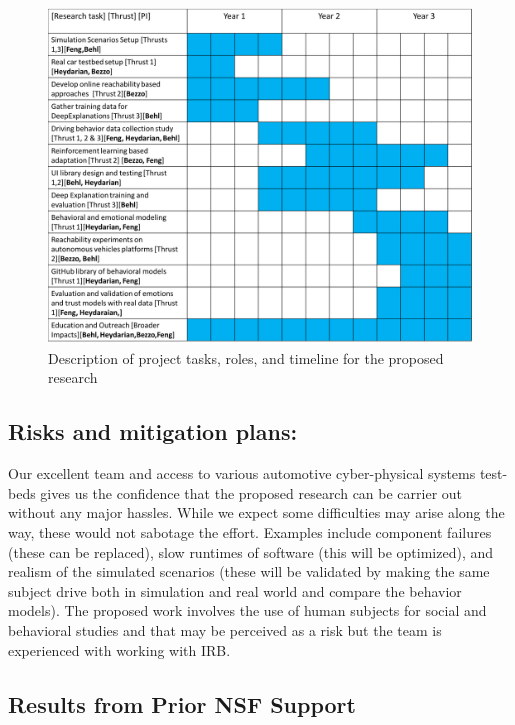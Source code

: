 \begin{figure}
    \centering
    \includegraphics[width=0.8\columnwidth]{figures/gantt_plan.png}
    \caption{Description of project tasks, roles, and timeline for the proposed research}
    \label{fig:gantt}
\end{figure}


\subsection{Risks and mitigation plans:}

Our excellent team and access to various automotive cyber-physical systems test-beds gives us the confidence that the proposed research can be carrier out without any major hassles. While we expect some difficulties may arise along the way, these would not sabotage the effort. Examples include component failures (these can be replaced), slow runtimes of software (this will be optimized), and realism of the simulated scenarios (these will be validated by making the same subject drive both in simulation and real world and compare the behavior models). The proposed work involves the use of human subjects for social and behavioral studies and that may be perceived as a risk but the team is experienced with working with IRB.

\subsection{Results from Prior NSF Support}
\label{subsec:prior}

